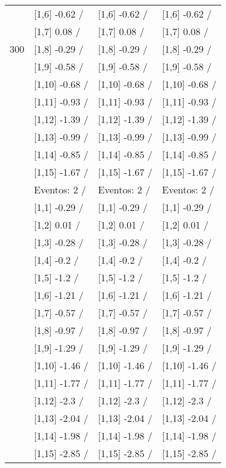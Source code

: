 \begin{table}
\begin{tabular}[t]{llll}
 & {}[1,6] -0.62  / & {}[1,6] -0.62  / & {}[1,6] -0.62  /\\
 & {}[1,7] 0.08  / & {}[1,7] 0.08  / & {}[1,7] 0.08  /\\
300 & {}[1,8] -0.29  / & {}[1,8] -0.29  / & {}[1,8] -0.29  /\\
\addlinespace
 & {}[1,9] -0.58  / & {}[1,9] -0.58  / & {}[1,9] -0.58  /\\
 & {}[1,10] -0.68  / & {}[1,10] -0.68  / & {}[1,10] -0.68  /\\
 & {}[1,11] -0.93  / & {}[1,11] -0.93  / & {}[1,11] -0.93  /\\
 & {}[1,12] -1.39  / & {}[1,12] -1.39  / & {}[1,12] -1.39  /\\
 & {}[1,13] -0.99  / & {}[1,13] -0.99  / & {}[1,13] -0.99  /\\
\addlinespace
 & {}[1,14] -0.85  / & {}[1,14] -0.85  / & {}[1,14] -0.85  /\\
 & {}[1,15] -1.67  / & {}[1,15] -1.67  / & {}[1,15] -1.67  /\\
 & Eventos:  2 / & Eventos:  2 / & Eventos:  2 /\\
 & {}[1,1] -0.29  / & {}[1,1] -0.29  / & {}[1,1] -0.29  /\\
 & {}[1,2] 0.01  / & {}[1,2] 0.01  / & {}[1,2] 0.01  /\\
\addlinespace
 & {}[1,3] -0.28  / & {}[1,3] -0.28  / & {}[1,3] -0.28  /\\
 & {}[1,4] -0.2  / & {}[1,4] -0.2  / & {}[1,4] -0.2  /\\
 & {}[1,5] -1.2  / & {}[1,5] -1.2  / & {}[1,5] -1.2  /\\
 & {}[1,6] -1.21  / & {}[1,6] -1.21  / & {}[1,6] -1.21  /\\
 & {}[1,7] -0.57  / & {}[1,7] -0.57  / & {}[1,7] -0.57  /\\
\addlinespace
500 & {}[1,8] -0.97  / & {}[1,8] -0.97  / & {}[1,8] -0.97  /\\
 & {}[1,9] -1.29  / & {}[1,9] -1.29  / & {}[1,9] -1.29  /\\
 & {}[1,10] -1.46  / & {}[1,10] -1.46  / & {}[1,10] -1.46  /\\
 & {}[1,11] -1.77  / & {}[1,11] -1.77  / & {}[1,11] -1.77  /\\
 & {}[1,12] -2.3  / & {}[1,12] -2.3  / & {}[1,12] -2.3  /\\
\addlinespace
 & {}[1,13] -2.04  / & {}[1,13] -2.04  / & {}[1,13] -2.04  /\\
 & {}[1,14] -1.98  / & {}[1,14] -1.98  / & {}[1,14] -1.98  /\\
 & {}[1,15] -2.85  / & {}[1,15] -2.85  / & {}[1,15] -2.85  /\\
\bottomrule
\end{tabular}
\end{table}
